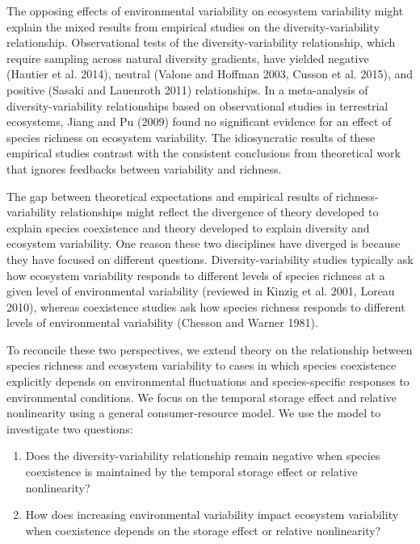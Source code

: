 \documentclass[12pt,]{article}
\begin{document}
The opposing effects of environmental variability on ecosystem
variability might explain the mixed results from empirical studies on
the diversity-variability relationship. Observational tests of the
diversity-variability relationship, which require sampling across
natural diversity gradients, have yielded negative (Hautier et al.
2014), neutral (Valone and Hoffman 2003, Cusson et al. 2015), and
positive (Sasaki and Lauenroth 2011) relationships. In a meta-analysis
of diversity-variability relationships based on observational studies in
terrestrial ecosystems, Jiang and Pu (2009) found no significant
evidence for an effect of species richness on ecosystem variability.
The idiosyncratic results of these empirical studies contrast with the
consistent conclusions from theoretical work that ignores feedbacks
between variability and richness.

The gap between theoretical expectations and empirical results of
richness-variability relationships might reflect the divergence of
theory developed to explain species coexistence and theory developed to
explain diversity and ecosystem variability. One reason these two
disciplines have diverged is because they have focused on different
questions. Diversity-variability studies typically ask how ecosystem
variability responds to different levels of species richness at a given
level of environmental variability (reviewed in Kinzig et al. 2001,
Loreau 2010), whereas coexistence studies ask how species richness
responds to different levels of environmental variability (Chesson and
Warner 1981).

To reconcile these two perspectives, we extend theory on the
relationship between species richness and ecosystem variability to cases
in which species coexistence explicitly depends on environmental
fluctuations and species-specific responses to environmental conditions.
We focus on the temporal storage effect and relative nonlinearity using
a general consumer-resource model. We use the model to investigate two
questions:

\begin{enumerate}
\def\labelenumi{\arabic{enumi}.}
\item
  Does the diversity-variability relationship remain negative when
  species coexistence is maintained by the temporal storage effect or
  relative nonlinearity?
\item
  How does increasing environmental variability impact ecosystem
  variability when coexistence depends on the storage effect or relative
  nonlinearity?
\end{enumerate}
\end{document}
